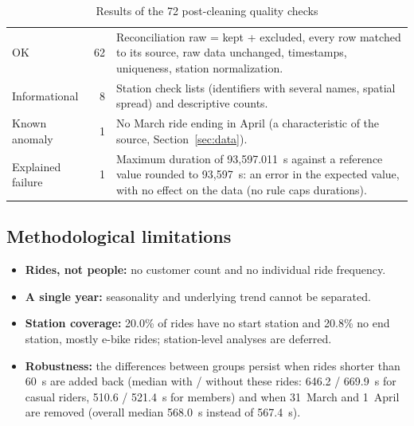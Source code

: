 \begin{table}[H]
\caption{Results of the 72 post-cleaning quality checks}
\label{tab:qa}
\small
\begin{tabularx}{\linewidth}{L{3.4cm} r Y}
\toprule
{} &  &  \\
\midrule
OK & 62 & Reconciliation raw = kept + excluded, every row matched to its source, raw data unchanged, timestamps, uniqueness, station normalization. \\
Informational & 8 & Station check lists (identifiers with several names, spatial spread) and descriptive counts. \\
Known anomaly & 1 & No March ride ending in April (a characteristic of the source, Section~\ref{sec:data}). \\
Explained failure & 1 & Maximum duration of 93,597.011~s against a reference value rounded to 93,597~s: an error in the expected value, with no effect on the data (no rule caps durations). \\
\bottomrule
\end{tabularx}
\end{table}

\subsection{Methodological limitations}
\begin{itemize}
  \item \textbf{Rides, not people:} no customer count and no individual ride frequency.
  \item \textbf{A single year:} seasonality and underlying trend cannot be separated.
  \item \textbf{Station coverage:} 20.0\% of rides have no start station and 20.8\% no end station, mostly e-bike rides; station-level analyses are deferred.
  \item \textbf{Robustness:} the differences between groups persist when rides shorter than 60~s are added back (median with / without these rides: 646.2 / 669.9~s for casual riders, 510.6 / 521.4~s for members) and when 31~March and 1~April are removed (overall median 568.0~s instead of 567.4~s).
\end{itemize}
